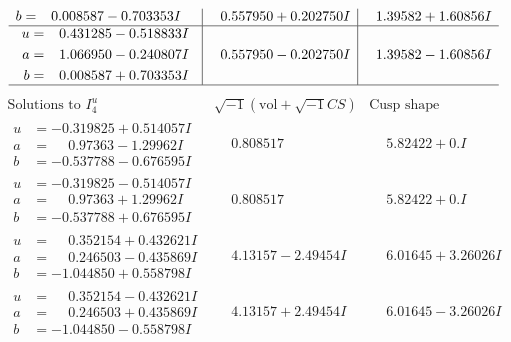 \documentclass[1p]{elsarticle_modified}
\theoremstyle{definition}
\newcommand{\I}{\sqrt{-1}}
\begin{document}
$$\begin{array}{c|c|c}
\begin{aligned}
b &= \phantom{-}0.008587 - 0.703353 I\end{aligned}
 & \phantom{-}0.557950 + 0.202750 I & \phantom{-}1.39582 + 1.60856 I \\ \hline\begin{aligned}
u &= \phantom{-}0.431285 - 0.518833 I \\
a &= \phantom{-}1.066950 - 0.240807 I \\
b &= \phantom{-}0.008587 + 0.703353 I\end{aligned}
 & \phantom{-}0.557950 - 0.202750 I & \phantom{-}1.39582 - 1.60856 I\\
 \hline 
 \end{array}$$\newpage$$\begin{array}{c|c|c}  
\text{Solutions to }I^u_{4}& \I (\text{vol} + \sqrt{-1}CS) & \text{Cusp shape}\\
 \hline 
\begin{aligned}
u &= -0.319825 + 0.514057 I \\
a &= \phantom{-}0.97363 - 1.29962 I \\
b &= -0.537788 - 0.676595 I\end{aligned}
 & \phantom{-}0.808517\phantom{ +0.000000I} & \phantom{-}5.82422 + 0. I\phantom{ +0.000000I} \\ \hline\begin{aligned}
u &= -0.319825 - 0.514057 I \\
a &= \phantom{-}0.97363 + 1.29962 I \\
b &= -0.537788 + 0.676595 I\end{aligned}
 & \phantom{-}0.808517\phantom{ +0.000000I} & \phantom{-}5.82422 + 0. I\phantom{ +0.000000I} \\ \hline\begin{aligned}
u &= \phantom{-}0.352154 + 0.432621 I \\
a &= \phantom{-}0.246503 - 0.435869 I \\
b &= -1.044850 + 0.558798 I\end{aligned}
 & \phantom{-}4.13157 - 2.49454 I & \phantom{-}6.01645 + 3.26026 I \\ \hline\begin{aligned}
u &= \phantom{-}0.352154 - 0.432621 I \\
a &= \phantom{-}0.246503 + 0.435869 I \\
b &= -1.044850 - 0.558798 I\end{aligned}
 & \phantom{-}4.13157 + 2.49454 I & \phantom{-}6.01645 - 3.26026 I \\ \hline\begin{aligned}

\end{aligned}
\end{array}$$
\end{document}
